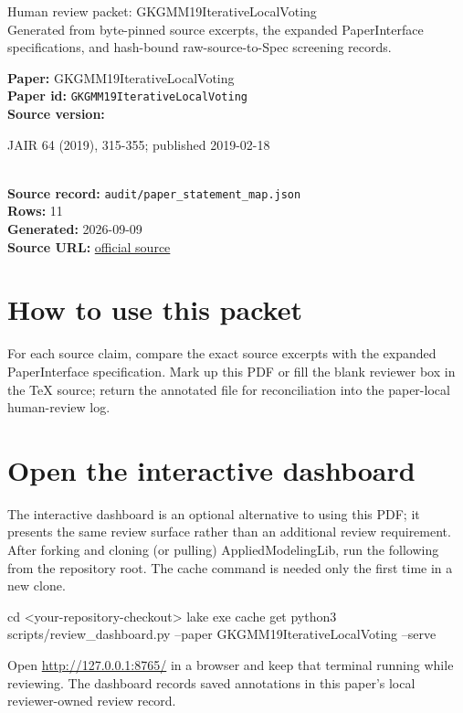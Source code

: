 \documentclass[10pt]{article}
\begin{document}
\fontsize{9}{10}\selectfont

\begin{center}
{\LARGE Human review packet: GKGMM19IterativeLocalVoting}\\[0.35em]
\small Generated from byte-pinned source excerpts, the expanded PaperInterface
specifications, and hash-bound raw-source-to-Spec screening records.
\end{center}

\noindent\textbf{Paper:} GKGMM19IterativeLocalVoting\\
\textbf{Paper id:} \texttt{GKGMM19IterativeLocalVoting}\\
\textbf{Source version:} \parbox[t]{0.76\linewidth}{\raggedright JAIR 64 (2019), 315-355; published 2019-02-18}\\
\textbf{Source record:} \texttt{audit/paper\_statement\_map.json}\\
\textbf{Rows:} 11\\
\textbf{Generated:} 2026-09-09\\
\textbf{Source URL:} \href{https://www.jair.org/index.php/jair/article/download/11358/26474/21047}{official source}





\section*{How to use this packet}
For each source claim, compare the exact source excerpts with the expanded
PaperInterface specification. Mark up this PDF or fill the blank reviewer box in the TeX source;
return the annotated file for reconciliation into the paper-local human-review
log.

\section*{Open the interactive dashboard}
The interactive dashboard is an optional alternative to using this PDF; it
presents the same review surface rather than an additional review requirement.
After forking and cloning (or pulling) AppliedModelingLib, run the following from the
repository root. The cache command is needed only the first time in a new clone.
\begin{ReviewVerbatim}
cd <your-repository-checkout>
lake exe cache get
python3 scripts/review_dashboard.py --paper GKGMM19IterativeLocalVoting --serve
\end{ReviewVerbatim}
Open \url{http://127.0.0.1:8765/} in a browser and keep that terminal running
while reviewing. The dashboard records saved annotations in this paper's local
reviewer-owned review record.
\end{document}
